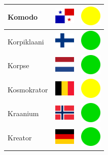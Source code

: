\documentclass[12pt, a4paper, twoside]{report}
\begin{document}
\begin{center}
\begin{longtable}{|p{5cm}|p{2cm}|p{2cm}|}
Komodo & \includegraphics[width=1cm]{4x3/pa} & \includegraphics[width=1cm]{likes/m} \\ \hline
Korpiklaani & \includegraphics[width=1cm]{4x3/fi} & \includegraphics[width=1cm]{likes/y} \\ \hline
Korpse & \includegraphics[width=1cm]{4x3/nl} & \includegraphics[width=1cm]{likes/y} \\ \hline
Kosmokrator & \includegraphics[width=1cm]{4x3/be} & \includegraphics[width=1cm]{likes/m} \\ \hline
Kraanium & \includegraphics[width=1cm]{4x3/no} & \includegraphics[width=1cm]{likes/y} \\ \hline
Kreator & \includegraphics[width=1cm]{4x3/de} & \includegraphics[width=1cm]{likes/y} \\ \hline

\end{longtable}
\end{center}
\end{document}
